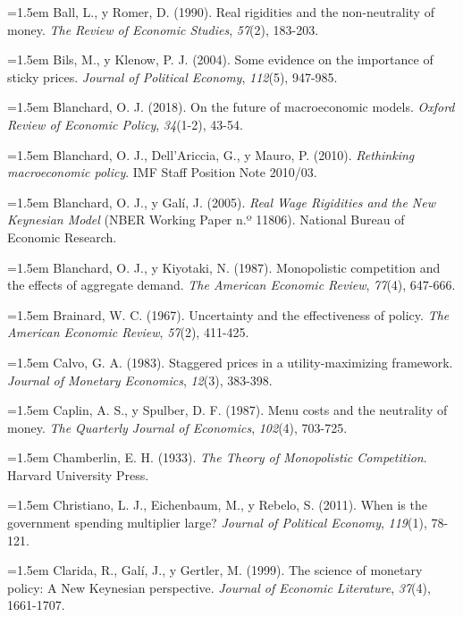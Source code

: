 \documentclass[10pt,a4paper]{article}
\begin{document}
\noindent\hangindent=1.5em Ball, L., y Romer, D. (1990). Real rigidities and the non-neutrality of money. \textit{The Review of Economic Studies}, \textit{57}(2), 183-203.

\noindent\hangindent=1.5em Bils, M., y Klenow, P. J. (2004). Some evidence on the importance of sticky prices. \textit{Journal of Political Economy}, \textit{112}(5), 947-985.

\noindent\hangindent=1.5em Blanchard, O. J. (2018). On the future of macroeconomic models. \textit{Oxford Review of Economic Policy}, \textit{34}(1-2), 43-54.

\noindent\hangindent=1.5em Blanchard, O. J., Dell'Ariccia, G., y Mauro, P. (2010). \textit{Rethinking macroeconomic policy}. IMF Staff Position Note 2010/03.

\noindent\hangindent=1.5em Blanchard, O. J., y Galí, J. (2005). \textit{Real Wage Rigidities and the New Keynesian Model} (NBER Working Paper n.º 11806). National Bureau of Economic Research.

\noindent\hangindent=1.5em Blanchard, O. J., y Kiyotaki, N. (1987). Monopolistic competition and the effects of aggregate demand. \textit{The American Economic Review}, \textit{77}(4), 647-666.

\noindent\hangindent=1.5em Brainard, W. C. (1967). Uncertainty and the effectiveness of policy. \textit{The American Economic Review}, \textit{57}(2), 411-425.

\noindent\hangindent=1.5em Calvo, G. A. (1983). Staggered prices in a utility-maximizing framework. \textit{Journal of Monetary Economics}, \textit{12}(3), 383-398.

\noindent\hangindent=1.5em Caplin, A. S., y Spulber, D. F. (1987). Menu costs and the neutrality of money. \textit{The Quarterly Journal of Economics}, \textit{102}(4), 703-725.

\noindent\hangindent=1.5em Chamberlin, E. H. (1933). \textit{The Theory of Monopolistic Competition}. Harvard University Press.

\noindent\hangindent=1.5em Christiano, L. J., Eichenbaum, M., y Rebelo, S. (2011). When is the government spending multiplier large? \textit{Journal of Political Economy}, \textit{119}(1), 78-121.

\noindent\hangindent=1.5em Clarida, R., Galí, J., y Gertler, M. (1999). The science of monetary policy: A New Keynesian perspective. \textit{Journal of Economic Literature}, \textit{37}(4), 1661-1707.
\end{document}
